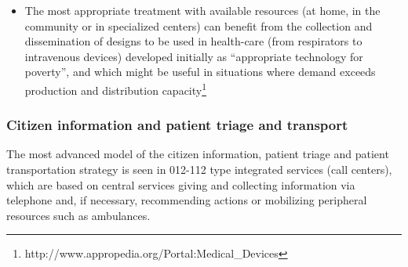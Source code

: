 \documentclass[12pt, a4]{scrartcl}
\begin{document}
\begin{itemize}
	\item The most appropriate treatment with available resources (at home, in the community or in specialized centers) can benefit from the collection and dissemination of designs to be used in health-care (from respirators to intravenous devices) developed initially as “appropriate technology for poverty”, and which might be useful in situations where demand exceeds production and distribution capacity\footnote{http://www.appropedia.org/Portal:Medical_Devices}
\end{itemize}

\subsubsection{Citizen information and patient triage and transport}
The most advanced model of the citizen information, patient triage and patient transportation strategy is seen in 012-112 type integrated services (call centers), which are based on central services giving and collecting information via telephone and, if necessary, recommending actions or mobilizing peripheral resources such as ambulances.
\end{document}
